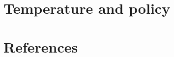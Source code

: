 \documentclass[
  letterpaper,
  DIV=11,
  numbers=noendperiod]{scrreprt}
\newlength{\cslhangindent}
\newlength{\cslentryspacingunit} %
\newenvironment{CSLReferences}[2] %
 {%
  \setlength{\parindent}{0pt}
  \ifodd #1
  \let\oldpar\par
  \def\par{\hangindent=\cslhangindent\oldpar}
  \fi
  \setlength{\parskip}{#2\cslentryspacingunit}
 }%
 {}
\begin{document}

\hypertarget{temperature-and-policy}{%
\chapter{Temperature and policy}\label{temperature-and-policy}}


\hypertarget{references}{%
\chapter*{References}\label{references}}


\hypertarget{refs}{}
\begin{CSLReferences}{0}{0}
\end{CSLReferences}
\end{document}
